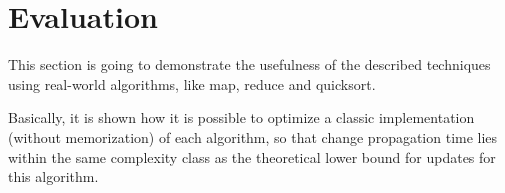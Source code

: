 \section{Evaluation}
This section is going to demonstrate the usefulness of the described techniques using real-world algorithms, like map, reduce and quicksort. 

Basically, it is shown how it is possible to optimize a classic implementation (without memorization) of each algorithm, so that change propagation time lies within the same complexity class as the theoretical lower bound for updates for this algorithm. 